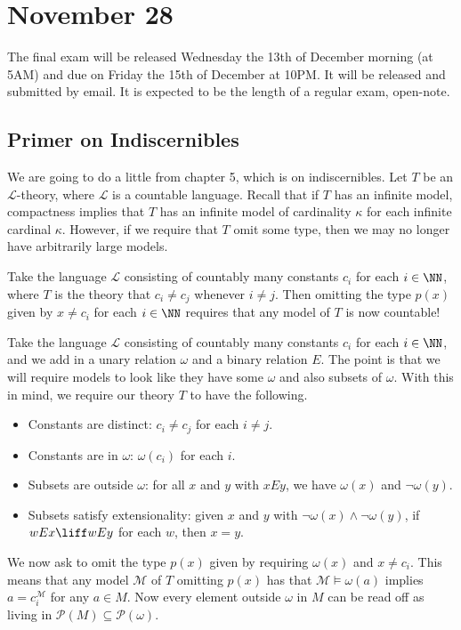\documentclass[../notes.tex]{subfiles}
\begin{document}
\section{November 28}

The final exam will be released Wednesday the 13th of December morning (at 5AM) and due on Friday the 15th of December at 10PM. It will be released and submitted by email. It is expected to be the length of a regular exam, open-note.

\subsection{Primer on Indiscernibles}
We are going to do a little from chapter 5, which is on indiscernibles. Let $T$ be an $\mathcal L$-theory, where $\mathcal L$ is a countable language. Recall that if $T$ has an infinite model, compactness implies that $T$ has an infinite model of cardinality $\kappa$ for each infinite cardinal $\kappa$. However, if we require that $T$ omit some type, then we may no longer have arbitrarily large models.
\begin{example}
	Take the language $\mathcal L$ consisting of countably many constants $c_i$ for each $i\in\NN$, where $T$ is the theory that $c_i\ne c_j$ whenever $i\ne j$. Then omitting the type $p(x)$ given by $x\ne c_i$ for each $i\in\NN$ requires that any model of $T$ is now countable!
\end{example}
\begin{example}
	Take the language $\mathcal L$ consisting of countably many constants $c_i$ for each $i\in\NN$, and we add in a unary relation $\omega$ and a binary relation $E$. The point is that we will require models to look like they have some $\omega$ and also subsets of $\omega$. With this in mind, we require our theory $T$ to have the following.
	\begin{itemize}
		\item Constants are distinct: $c_i\ne c_j$ for each $i\ne j$.
		\item Constants are in $\omega$: $\omega(c_i)$ for each $i$.
		\item Subsets are outside $\omega$: for all $x$ and $y$ with $xEy$, we have $\omega(x)$ and $\lnot\omega(y)$.
		\item Subsets satisfy extensionality: given $x$ and $y$ with $\lnot\omega(x)\land\lnot\omega(y)$, if $wEx\liff wEy$ for each $w$, then $x=y$.
	\end{itemize}
	We now ask to omit the type $p(x)$ given by requiring $\omega(x)$ and $x\ne c_i$. This means that any model $\mathcal M$ of $T$ omitting $p(x)$ has that $\mathcal M\models\omega(a)$ implies $a=c_i^\mathcal M$ for any $a\in M$. Now every element outside $\omega$ in $M$ can be read off as living in $\mathcal P(M)\subseteq\mathcal P(\omega)$.
\end{example}
\end{document}
